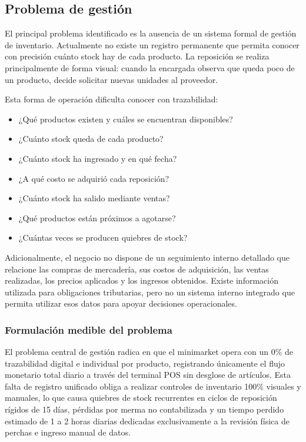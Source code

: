 \documentclass[10pt,a4paper]{article}
\begin{document}
\subsection{Problema de gestión}

El principal problema identificado es la ausencia de un sistema formal de gestión de inventario. Actualmente no existe un registro permanente que permita conocer con precisión cuánto stock hay de cada producto. La reposición se realiza principalmente de forma visual: cuando la encargada observa que queda poco de un producto, decide solicitar nuevas unidades al proveedor.

Esta forma de operación dificulta conocer con trazabilidad:

\begin{itemize}[leftmargin=*]
    \item ¿Qué productos existen y cuáles se encuentran disponibles?
    \item ¿Cuánto stock queda de cada producto?
    \item ¿Cuánto stock ha ingresado y en qué fecha?
    \item ¿A qué costo se adquirió cada reposición?
    \item ¿Cuánto stock ha salido mediante ventas?
    \item ¿Qué productos están próximos a agotarse?
    \item ¿Cuántas veces se producen quiebres de stock?
\end{itemize}

Adicionalmente, el negocio no dispone de un seguimiento interno detallado que relacione las compras de mercadería, sus costos de adquisición, las ventas realizadas, los precios aplicados y los ingresos obtenidos. Existe información utilizada para obligaciones tributarias, pero no un sistema interno integrado que permita utilizar esos datos para apoyar decisiones operacionales.

\subsubsection{Formulación medible del problema}

El problema central de gestión radica en que el minimarket opera con un 0\% de trazabilidad digital e individual por producto, registrando únicamente el flujo monetario total diario a través del terminal POS sin desglose de artículos. Esta falta de registro unificado obliga a realizar controles de inventario 100\% visuales y manuales, lo que causa quiebres de stock recurrentes en ciclos de reposición rígidos de 15 días, pérdidas por merma no contabilizada y un tiempo perdido estimado de 1 a 2 horas diarias dedicadas exclusivamente a la revisión física de perchas e ingreso manual de datos.
\end{document}
